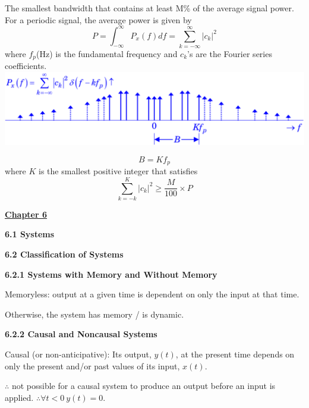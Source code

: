 \documentclass[landscape,a4paper]{extarticle}
\newenvironment{Figure}
  {\noindent\minipage{\linewidth}}
  {\endminipage\par\medskip}
\begin{document}
\begin{multicols*}{5}
    The smallest bandwidth that contains at least M\% of the average signal power. For a periodic signal, the average power is given by
    \[
        P = \int_{-\infty}^{\infty}P_x(f)df=\sum_{k=-\infty}^{\infty}|c_k|^2
    \]
    where $f_p$(Hz) is the fundamental frequency and $c_k$'s are the Fourier series coefficients.
    \begin{Figure}
        \centering
        \includegraphics[width=\linewidth]{MPercentPower.png}
    \end{Figure}
    \[
        B = Kf_p
    \]
    where $K$ is the smallest positive integer that satisfies 
    \[
        \sum_{k=-k}^{K}|c_k|^2 \geq \frac{M}{100} \times P
    \]

    \textbf{\uline{Chapter 6}}

    \textbf{6.1 Systems}


    \textbf{6.2 Classification of Systems}

    \textbf{6.2.1 Systems with Memory and Without Memory}

    Memoryless: output at a given time is dependent on only the input at that time.

    Otherwise, the system has memory / is dynamic.

    \textbf{6.2.2 Causal and Noncausal Systems}

    Causal (or non-anticipative): Its output, $y(t)$, at the present time depends on only the present and/or past values of its input, $x(t)$.

    $\therefore$ not possible for a causal system to produce an output before an input is applied. $\therefore \forall t < 0\ y(t)=0$.


\end{multicols*}
\end{document}
